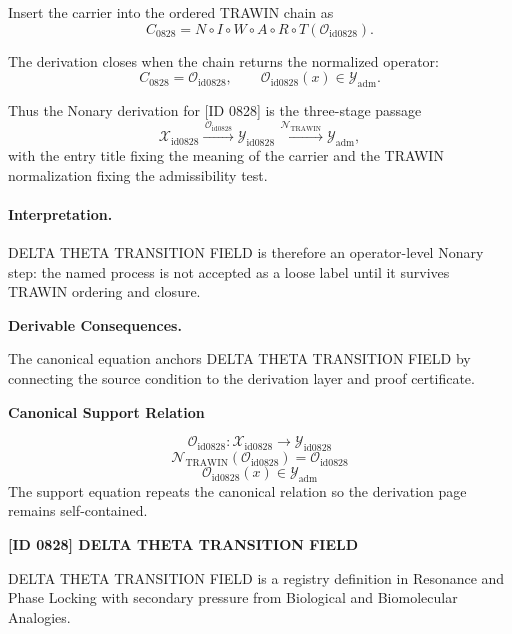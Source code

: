 Insert the carrier into the ordered TRAWIN chain as\[
C_{0828}=N\circ I\circ W\circ A\circ R\circ T(\mathcal{O}_{\mathrm{id0828}}).
\]

The derivation closes when the chain returns the normalized operator:\[
C_{0828}=\mathcal{O}_{\mathrm{id0828}},\qquad \mathcal{O}_{\mathrm{id0828}}(x)\in\mathcal{Y}_{\mathrm{adm}}.
\]

Thus the Nonary derivation for [ID 0828] is the three-stage passage
\[
\mathcal{X}_{\mathrm{id0828}}\xrightarrow{\,\mathcal{O}_{\mathrm{id0828}}\,} \mathcal{Y}_{\mathrm{id0828}}\xrightarrow{\,\mathcal{N}_{\mathrm{TRAWIN}}\,} \mathcal{Y}_{\mathrm{adm}},
\]
with the entry title fixing the meaning of the carrier and the TRAWIN normalization fixing the admissibility test.

\paragraph{Interpretation.} DELTA THETA TRANSITION FIELD is therefore an operator-level Nonary step: the named process is not accepted as a loose label until it survives TRAWIN ordering and closure.

\par\vspace{0.35em}
\noindent\textbf{Derivable Consequences.}\quad
\begingroup
\footnotesize
\raggedright
The canonical equation anchors DELTA THETA TRANSITION FIELD by connecting the source condition to the derivation layer and proof certificate.
\par\endgroup

\noindent\textbf{Canonical Support Relation}\par
\[
\mathcal{O}_{\mathrm{id0828}}:\mathcal{X}_{\mathrm{id0828}}\longrightarrow\mathcal{Y}_{\mathrm{id0828}}
\]
\[
\mathcal{N}_{\mathrm{TRAWIN}}(\mathcal{O}_{\mathrm{id0828}})=\mathcal{O}_{\mathrm{id0828}}
\]
\[
\mathcal{O}_{\mathrm{id0828}}(x)\in\mathcal{Y}_{\mathrm{adm}}
\]
\noindent The support equation repeats the canonical relation so the derivation page remains self-contained.\par

\clearpage
\noindent\textbf{[ID 0828] DELTA THETA TRANSITION FIELD}\par
\vspace{0.35em}
\begingroup\small
{}
DELTA THETA TRANSITION FIELD is a registry definition in Resonance and Phase Locking with secondary pressure from Biological and Biomolecular Analogies.

